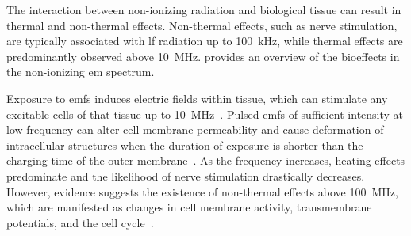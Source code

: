 The interaction between non-ionizing radiation and biological tissue can result in thermal and non-thermal effects.
Non-thermal effects, such as nerve stimulation, are typically associated with \gls{lf} radiation up to \SI{100}{\kHz}, while thermal effects are predominantly observed above \SI{10}{\MHz}.
 provides an overview of the bioeffects in the non-ionizing \gls{em} spectrum.
\begin{table}[b]
    \centering
    \caption{Summary of the effects of non-ionizing radiation on biological tissues.}
    \label{tab:interaction-mechanism}
\end{table}
Exposure to \gls{emf}s induces electric fields within tissue, which can stimulate any excitable cells of that tissue up to \SI{10}{\MHz}~\cite{Saunders2007neurobiological}.
Pulsed \gls{emf}s of sufficient intensity at low frequency can alter cell membrane permeability and cause deformation of intracellular structures when the duration of exposure is shorter than the charging time of the outer membrane~\cite{Joshi2010Critical}.
As the frequency increases, heating effects predominate and the likelihood of nerve stimulation drastically decreases.
However, evidence suggests the existence of non-thermal effects above \SI{100}{\MHz}, which are manifested as changes in cell membrane activity, transmembrane potentials, and the cell cycle~\cite{Romanenko2017interaction}.
